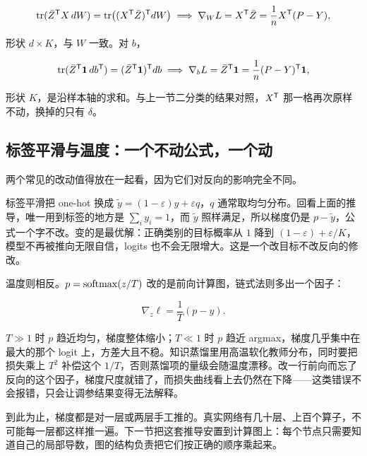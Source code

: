 \[
\operatorname{tr}(\bar Z^{\mathsf{T}}X\,dW)=\operatorname{tr}\bigl((X^{\mathsf{T}}\bar Z)^{\mathsf{T}}dW\bigr)
\;\Longrightarrow\;
\nabla_WL=X^{\mathsf{T}}\bar Z=\frac1nX^{\mathsf{T}}(P-Y),
\]

形状 \(d\times K\)，与 \(W\) 一致。对 \(b\)，

\[
\operatorname{tr}(\bar Z^{\mathsf{T}}\mathbf1\,db^{\mathsf{T}})=(\bar Z^{\mathsf{T}}\mathbf1)^{\mathsf{T}}db
\;\Longrightarrow\;
\nabla_bL=\bar Z^{\mathsf{T}}\mathbf1=\frac1n(P-Y)^{\mathsf{T}}\mathbf1,
\]

形状 \(K\)，是沿样本轴的求和。与上一节二分类的结果对照，\(X^{\mathsf{T}}\) 那一格再次原样不动，换掉的只有 \(\delta\)。

\subsection{标签平滑与温度：一个不动公式，一个动}

两个常见的改动值得放在一起看，因为它们对反向的影响完全不同。

标签平滑把 one-hot 换成 \(\tilde y=(1-\varepsilon)y+\varepsilon q\)，\(q\) 通常取均匀分布。回看上面的推导，唯一用到标签的地方是 \(\sum_iy_i=1\)，而 \(\tilde y\) 照样满足，所以梯度仍是 \(p-\tilde y\)，公式一个字不改。变的是最优解：正确类别的目标概率从 \(1\) 降到 \((1-\varepsilon)+\varepsilon/K\)，模型不再被推向无限自信，logits 也不会无限增大。这是一个改目标不改反向的修改。

温度则相反。\(p=\operatorname{softmax}(z/T)\) 改的是前向计算图，链式法则多出一个因子：

\[
\nabla_z\ell=\frac1T(p-y).
\]

\(T\gg1\) 时 \(p\) 趋近均匀，梯度整体缩小；\(T\ll1\) 时 \(p\) 趋近 argmax，梯度几乎集中在最大的那个 logit 上，方差大且不稳。知识蒸馏里用高温软化教师分布，同时要把损失乘上 \(T^2\) 补偿这个 \(1/T\)，否则蒸馏项的量级会随温度漂移。改一行前向而忘了反向的这个因子，梯度尺度就错了，而损失曲线看上去仍然在下降——这类错误不会报错，只会让调参结果变得无法解释。

到此为止，梯度都是对一层或两层手工推的。真实网络有几十层、上百个算子，不可能每一层都这样推一遍。下一节把这套推导安置到计算图上：每个节点只需要知道自己的局部导数，图的结构负责把它们按正确的顺序乘起来。
